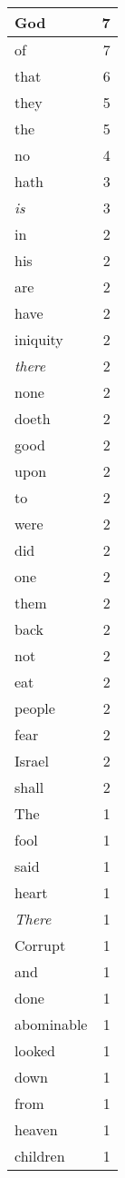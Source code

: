 \begin{center}
\begin{longtable}{l|r}
\hline \hline
\endlastfoot
God & 7 \\ \hline
of & 7 \\ \hline
that & 6 \\ \hline
they & 5 \\ \hline
the & 5 \\ \hline
no & 4 \\ \hline
hath & 3 \\ \hline
\emph{is} & 3 \\ \hline
in & 2 \\ \hline
his & 2 \\ \hline
are & 2 \\ \hline
have & 2 \\ \hline
iniquity & 2 \\ \hline
\emph{there} & 2 \\ \hline
none & 2 \\ \hline
doeth & 2 \\ \hline
good & 2 \\ \hline
upon & 2 \\ \hline
to & 2 \\ \hline
were & 2 \\ \hline
did & 2 \\ \hline
one & 2 \\ \hline
them & 2 \\ \hline
back & 2 \\ \hline
not & 2 \\ \hline
eat & 2 \\ \hline
people & 2 \\ \hline
fear & 2 \\ \hline
Israel & 2 \\ \hline
shall & 2 \\ \hline
The & 1 \\ \hline
fool & 1 \\ \hline
said & 1 \\ \hline
heart & 1 \\ \hline
\emph{There} & 1 \\ \hline
Corrupt & 1 \\ \hline
and & 1 \\ \hline
done & 1 \\ \hline
abominable & 1 \\ \hline
looked & 1 \\ \hline
down & 1 \\ \hline
from & 1 \\ \hline
heaven & 1 \\ \hline
children & 1 \\ \hline

\end{longtable}
\end{center}

